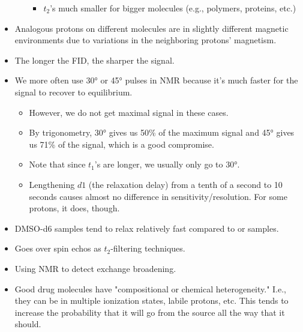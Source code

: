 \documentclass[../notes.tex]{subfiles}
\begin{document}
\begin{itemize}
\begin{itemize}
\begin{itemize}
            \item $t_2$'s much smaller for bigger molecules (e.g., polymers, proteins, etc.)
        \end{itemize}
    \end{itemize}
    \item Analogous protons on different molecules are in slightly different magnetic environments due to variations in the neighboring protons' magnetism.
    \item The longer the FID, the sharper the signal.
    \item We more often use \ang{30} or \ang{45} pulses in  NMR because it's much faster for the signal to recover to equilibrium.
    \begin{itemize}
        \item However, we do not get maximal signal in these cases.
        \item By trigonometry, \ang{30} gives us 50\% of the maximum signal and \ang{45} gives us 71\% of the signal, which is a good compromise.
        \item Note that since  $t_1$'s are longer, we usually only go to \ang{30}.
        \item Lengthening $d1$ (the relaxation delay) from a tenth of a second to 10 seconds causes almost no difference in sensitivity/resolution. For some protons, it does, though.
    \end{itemize}
    \item DMSO-d6 samples tend to relax relatively fast compared to  or  samples.
    \item Goes over spin echos as $t_2$-filtering techniques.
    \item Using NMR to detect exchange broadening.
    \item Good drug molecules have "compositional or chemical heterogeneity." I.e., they can be in multiple ionization states, labile protons, etc. This tends to increase the probability that it will go from the source all the way that it should.
\end{itemize}
\end{document}
